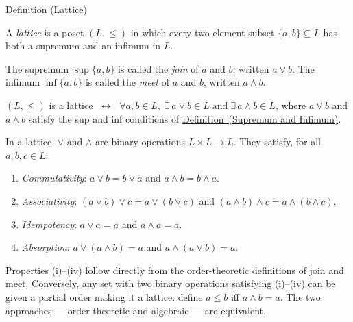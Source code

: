 
\begin{definitionbox}{Definition (Lattice)}
\begin{definition}[Lattice]\label{def:lattice}
A \emph{lattice} is a poset $(L, \leq)$ in which every two-element subset
$\{a, b\} \subseteq L$ has both a supremum and an infimum in $L$.

The supremum $\sup\{a,b\}$ is called the \emph{join} of $a$ and $b$,
written $a \vee b$.
The infimum $\inf\{a,b\}$ is called the \emph{meet} of $a$ and $b$,
written $a \wedge b$.
\end{definition}
\end{definitionbox}

\begin{remark*}
$(L, \leq)$ is a lattice $\;\leftrightarrow\;$
$\forall a, b \in L,\;\exists\, a \vee b \in L \;\text{and}\; \exists\, a \wedge b \in L$,
where $a \vee b$ and $a \wedge b$ satisfy the sup and inf conditions of
\hyperref[def:sup-inf]{Definition~(Supremum and Infimum)}.
\end{remark*}

\begin{remark*}
\label{rem:lattice-operations}
In a lattice, $\vee$ and $\wedge$ are binary operations $L \times L \to L$.
They satisfy, for all $a, b, c \in L$:
\begin{enumerate}[label=(\roman*)]
  \item \emph{Commutativity}: $a \vee b = b \vee a$ and $a \wedge b = b \wedge a$.
  \item \emph{Associativity}: $(a \vee b) \vee c = a \vee (b \vee c)$ and
        $(a \wedge b) \wedge c = a \wedge (b \wedge c)$.
  \item \emph{Idempotency}: $a \vee a = a$ and $a \wedge a = a$.
  \item \emph{Absorption}: $a \vee (a \wedge b) = a$ and
        $a \wedge (a \vee b) = a$.
\end{enumerate}
Properties (i)--(iv) follow directly from the order-theoretic definitions of join
and meet.  Conversely, any set with two binary operations satisfying (i)--(iv)
can be given a partial order making it a lattice: define $a \leq b$ iff
$a \wedge b = a$.  The two approaches — order-theoretic and algebraic — are
equivalent.
\end{remark*}

